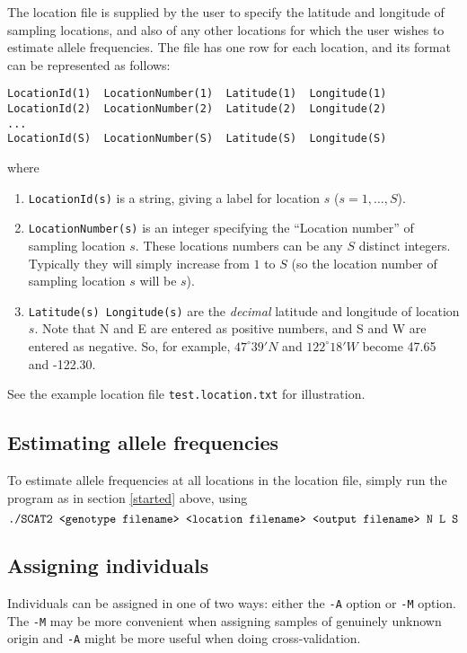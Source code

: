 \documentclass[11pt,titlepage,times,letterpaper]{article}
\begin{document}
The location file is supplied by the user to specify the latitude and
longitude of sampling locations, and also of any other locations
for which the user wishes to estimate allele frequencies.
The file has one row for each location, and its format 
can be represented as follows:
\begin{verbatim}
LocationId(1)  LocationNumber(1)  Latitude(1)  Longitude(1)
LocationId(2)  LocationNumber(2)  Latitude(2)  Longitude(2)
...
LocationId(S)  LocationNumber(S)  Latitude(S)  Longitude(S)
\end{verbatim}
where
\begin{enumerate}
\item{\tt LocationId(s)} is a string, giving a label for location $s$
($s = 1,\dots,S$).
\item{\tt LocationNumber(s)} is an integer specifying the ``Location
number'' of sampling location $s$. These locations numbers can be
any $S$ distinct integers. Typically they will simply increase from $1$ to $S$
(so the location number of sampling location $s$ will be $s$). 
\item{{\tt Latitude(s) Longitude(s)}} are the {\it decimal} latitude
and longitude of location $s$. Note that N and E are entered as
positive numbers, and S and W are entered as negative. So, for
example, $47^\circ 39' N$ and $122^\circ 18' W$ become 47.65 and -122.30.
\end{enumerate}
See the example location file {\tt test.location.txt} for illustration.

\subsection{Estimating allele frequencies}

To estimate allele frequencies at all locations in the location
file, simply run the program as in section \ref{started} above,
using
$$\text{{\tt ./SCAT2 <genotype filename> <location filename> <output
filename> N L S}}$$

\subsection{Assigning individuals}  \label{assign}

Individuals can be assigned in one of two ways: either the {\tt -A} option or {\tt -M} option.
The {\tt -M}  may be more convenient when assigning samples of genuinely 
unknown origin and  {\tt -A} might be more useful when doing cross-validation.
\end{document}
